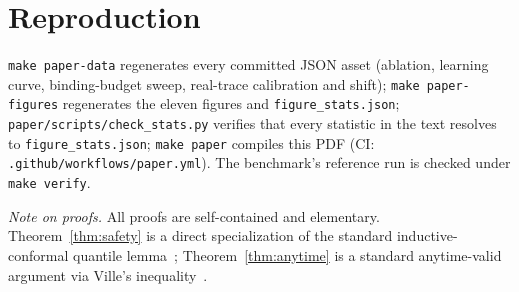 \documentclass[11pt]{article}
\theoremstyle{plain}
\theoremstyle{definition}
\theoremstyle{remark}
\begin{document}
\section{Reproduction}\label{app:repro}
\texttt{make paper-data} regenerates every committed JSON asset (ablation, learning curve, binding-budget sweep, real-trace calibration and shift); \texttt{make paper-figures} regenerates the eleven figures and \texttt{figure\_stats.json}; \texttt{paper/scripts/check\_stats.py} verifies that every statistic in the text resolves to \texttt{figure\_stats.json}; \texttt{make paper} compiles this PDF (CI: \texttt{.github/workflows/paper.yml}). The benchmark's reference run is checked under \texttt{make verify}.

\medskip
\noindent\footnotesize\emph{Note on proofs.} All proofs are self-contained and elementary. Theorem~\ref{thm:safety} is a direct specialization of the standard inductive-conformal quantile lemma~\cite{vovk2005,angelopoulos2023}; Theorem~\ref{thm:anytime} is a standard anytime-valid argument via Ville's inequality~\cite{howard2021,ramdas2023}.
\end{document}
